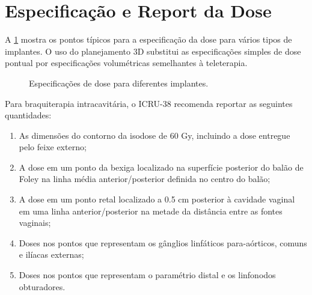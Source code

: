\documentclass[11pt,a4paper]{article}
\begin{document}
\section{Especificação e Report da Dose}

	A \ref{fig:especificacaoDeDoseImplante} mostra os pontos típicos para a especificação da dose para vários tipos de implantes. O uso do planejamento 3D substitui as especificações simples de dose pontual por especificações volumétricas semelhantes à teleterapia.

	\begin{figure}[h]
		\centering
		\caption{Especificações de dose para diferentes implantes.}
		\label{fig:especificacaoDeDoseImplante}
	\end{figure}

	Para braquiterapia intracavitária, o ICRU-38 recomenda reportar as seguintes quantidades:

	\begin{enumerate}[label=\textcolor{CarnationPink}{(\roman*)}]
		\item As dimensões do contorno da isodose de 60 Gy, incluindo a dose entregue pelo feixe externo;
		\item A dose em um ponto da bexiga localizado na superfície posterior do balão de Foley na linha média anterior/posterior definida no centro do balão;
		\item A dose em um ponto retal localizado a 0.5 cm posterior à cavidade vaginal em uma linha anterior/posterior na metade da distância entre as fontes vaginais;
		\item Doses nos pontos que representam os gânglios linfáticos para-aórticos, comuns e ilíacas externas;
		\item Doses nos pontos que representam o paramétrio distal e os linfonodos obturadores.
	\end{enumerate}
\end{document}
